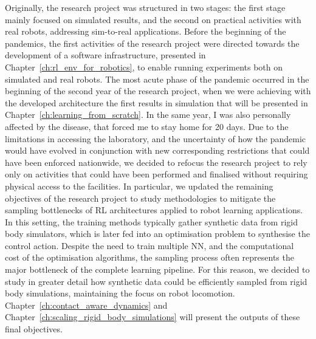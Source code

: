 Originally, the research project was structured in two stages: the first stage mainly focused on simulated results, and the second on practical activities with real robots, addressing sim-to-real applications.
Before the beginning of the pandemics, the first activities of the research project were directed towards the development of a software infrastructure, presented in Chapter~\ref{ch:rl_env_for_robotics}, to enable running experiments both on simulated and real robots.
The most acute phase of the pandemic occurred in the beginning of the second year of the research project, when we were achieving with the developed architecture the first results in simulation that will be presented in Chapter~\ref{ch:learning_from_scratch}.
In the same year, I was also personally affected by the disease, that forced me to stay home for 20 days.
Due to the limitations in accessing the laboratory, and the uncertainty of how the pandemic would have evolved in conjunction with new corresponding restrictions that could have been enforced nationwide, we decided to refocus the research project to rely only on activities that could have been performed and finalised without requiring physical access to the facilities.
In particular, we updated the remaining objectives of the research project to study methodologies to mitigate the sampling bottlenecks of \acl{RL} architectures applied to robot learning applications.
In this setting, the training methods typically gather synthetic data from rigid body simulators, which is later fed into an optimisation problem to synthesise the control action.
Despite the need to train multiple \acl{NN}, and the computational cost of the optimisation algorithms, the sampling process often represents the major bottleneck of the complete learning pipeline.
For this reason, we decided to study in greater detail how synthetic data could be efficiently sampled from rigid body simulations, maintaining the focus on robot locomotion.
Chapter~\ref{ch:contact_aware_dynamics} and Chapter~\ref{ch:scaling_rigid_body_simulations} will present the outputs of these final objectives.
